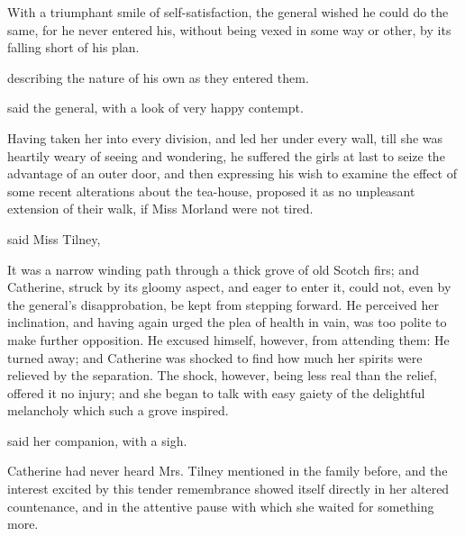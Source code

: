 
With a triumphant smile of self-satisfaction, the general wished he could do the same, for he never entered his, without being vexed in some way or other, by its falling short of his plan.

 describing the nature of his own as they entered them.


 said the general, with a look of very happy contempt.

Having taken her into every division, and led her under every wall, till she was heartily weary of seeing and wondering, he suffered the girls at last to seize the advantage of an outer door, and then expressing his wish to examine the effect of some recent alterations about the tea-house, proposed it as no unpleasant extension of their walk, if Miss Morland were not tired. 

 said Miss Tilney, 

It was a narrow winding path through a thick grove of old Scotch firs; and Catherine, struck by its gloomy aspect, and eager to enter it, could not, even by the general's disapprobation, be kept from stepping forward. He perceived her inclination, and having again urged the plea of health in vain, was too polite to make further opposition. He excused himself, however, from attending them:  He turned away; and Catherine was shocked to find how much her spirits were relieved by the separation. The shock, however, being less real than the relief, offered it no injury; and she began to talk with easy gaiety of the delightful melancholy which such a grove inspired.

 said her companion, with a sigh. 

Catherine had never heard Mrs. Tilney mentioned in the family before, and the interest excited by this tender remembrance showed itself directly in her altered countenance, and in the attentive pause with which she waited for something more.

